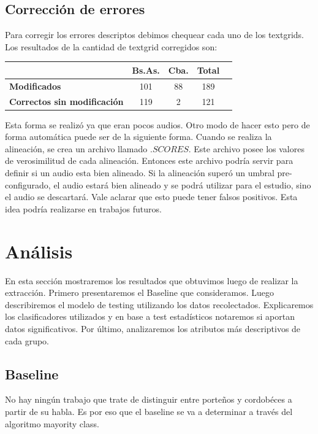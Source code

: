 \documentclass[11pt,a4paper,twoside]{tesis}
\begin{document}
\section{Corrección de errores}

Para corregir los errores descriptos debimos chequear cada uno de los textgrids. Los resultados de la cantidad de textgrid corregidos son:

\begin{table}[h]
\centering
\begin{tabular}{|l|c|c|c|c|}
\hline
\textbf{}  & \textbf{Bs.As. } & \textbf{Cba.} & \textbf{Total} \\ \hline
\textbf{Modificados}  & 101 & 88 & 189 \\ \hline
\textbf{Correctos sin modificación}  & 119 & 2 & 121 \\ \hline
\end{tabular}
\end{table}

Esta forma se realizó ya que eran pocos audios. Otro modo de hacer esto pero de forma automática puede ser de la siguiente forma. Cuando se realiza la alineación, se crea un archivo llamado $.SCORES$. Este archivo posee los valores de verosimilitud de cada alineación. Entonces este archivo podría servir para definir si un audio esta bien alineado. Si la alineación superó un umbral pre-configurado, el audio estará bien alineado y se podrá utilizar para el estudio, sino el audio se descartará. Vale aclarar que esto puede tener falsos positivos. Esta idea podría realizarse en trabajos futuros.

\chapter{Análisis}

En esta sección mostraremos los resultados que obtuvimos luego de realizar la extracción. Primero presentaremos el Baseline que consideramos. Luego describiremos el modelo de testing utilizando los datos recolectados. Explicaremos los clasificadores utilizados y en base a test estadísticos notaremos si aportan datos significativos. Por último, analizaremos los atributos más descriptivos de cada grupo.

\section{Baseline}

No hay ningún trabajo que trate de distinguir entre porteños y cordobéces a partir de su habla. Es por eso que el baseline se va a determinar a través del algoritmo mayority class.
\end{document}
